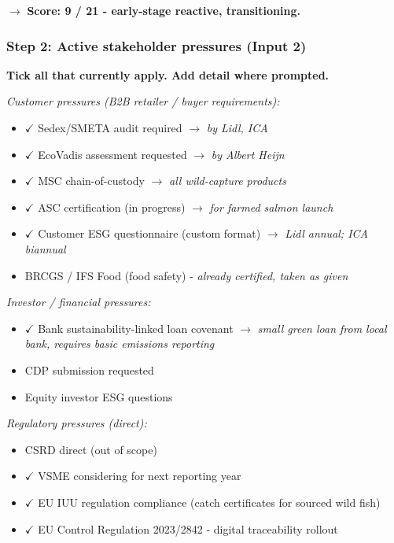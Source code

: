 \documentclass[
]{article}
\begin{document}
$\to$ \textbf{Score: 9 / 21 - early-stage reactive, transitioning.}

\subsubsection{Step 2: Active stakeholder pressures (Input
2)}\label{step-2-active-stakeholder-pressures-input-2}

\textbf{Tick all that currently apply. Add detail where prompted.}

\emph{Customer pressures (B2B retailer / buyer requirements):}

\begin{itemize}
\item
  $\checkmark$ Sedex/SMETA audit required $\to$ \emph{by Lidl, ICA}
\item
  $\checkmark$ EcoVadis assessment requested $\to$ \emph{by Albert Heijn}
\item
  $\checkmark$ MSC chain-of-custody $\to$ \emph{all wild-capture products}
\item
  $\checkmark$ ASC certification (in progress) $\to$ \emph{for farmed salmon launch}
\item
  $\checkmark$ Customer ESG questionnaire (custom format) $\to$ \emph{Lidl annual; ICA
  biannual}
\item[$\square$]
  BRCGS / IFS Food (food safety) - \emph{already certified, taken as
  given}
\end{itemize}

\emph{Investor / financial pressures:}

\begin{itemize}
\item
  $\checkmark$ Bank sustainability-linked loan covenant $\to$ \emph{small green loan
  from local bank, requires basic emissions reporting}
\item[$\square$]
  CDP submission requested
\item[$\square$]
  Equity investor ESG questions
\end{itemize}

\emph{Regulatory pressures (direct):}

\begin{itemize}
\item[$\square$]
  CSRD direct (out of scope)
\item
  $\checkmark$ VSME considering for next reporting year
\item
  $\checkmark$ EU IUU regulation compliance (catch certificates for sourced wild
  fish)
\item
  $\checkmark$ EU Control Regulation 2023/2842 - digital traceability rollout
\end{itemize}
\end{document}
